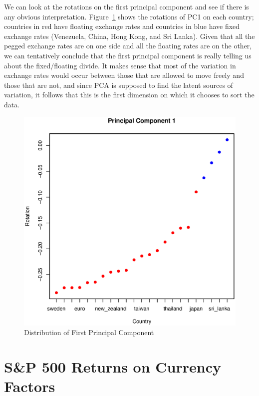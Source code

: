 \documentclass[11pt, fleqn]{article}
\begin{document}
We can look at the rotations on the first principal component and see if there is any obvious interpretation. Figure~\ref{fig:pc1_pegs} shows the rotations of PC1 on each country; countries in red have floating exchange rates and countries in blue have fixed exchange rates (Venezuela, China, Hong Kong, and Sri Lanka). Given that all the pegged exchange rates are on one side and all the floating rates are on the other, we can tentatively conclude that the first principal component is really telling us about the fixed/floating divide. It makes sense that most of the variation in exchange rates would occur between those that are allowed to move freely and those that are not, and since PCA is supposed to find the latent sources of variation, it follows that this is the first dimension on which it chooses to sort the data.

\begin{figure}[!htb]
  \centering
  \includegraphics[scale=.5]{pc1_pegs.eps}
  \caption{Distribution of First Principal Component}
  \label{fig:pc1_pegs}
\end{figure} 

\section{S\&P 500 Returns on Currency Factors} \label{sec:sp500}
\end{document}
